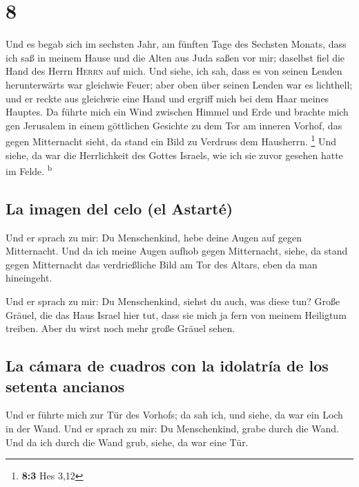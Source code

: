 \hypertarget{section-7}{%
\section{8}\label{section-7}}

 Und es begab sich im sechsten Jahr, am fünften Tage des
Sechsten Monats, dass ich saß in meinem Hause und die Alten aus Juda
saßen vor mir; daselbst fiel die Hand des Herrn \textsc{Herrn} auf mich.
 Und siehe, ich sah, dass es von seinen Lenden
herunterwärts war gleichwie Feuer; aber oben über seinen Lenden war es
lichthell;  und er reckte aus gleichwie eine Hand und
ergriff mich bei dem Haar meines Hauptes. Da führte mich ein Wind
zwischen Himmel und Erde und brachte mich gen Jerusalem in einem
göttlichen Gesichte zu dem Tor am inneren Vorhof, das gegen Mitternacht
sieht, da stand ein Bild zu Verdruss dem Hausherrn. \footnote{\textbf{8:3}
  Hes 3,12}  Und siehe, da war die Herrlichkeit des Gottes
Israels, wie ich sie zuvor gesehen hatte im Felde. \textsuperscript{b}

\hypertarget{la-imagen-del-celo-el-astartuxe9}{%
\subsection{La imagen del celo (el
Astarté)}\label{la-imagen-del-celo-el-astartuxe9}}

 Und er sprach zu mir: Du Menschenkind, hebe deine Augen
auf gegen Mitternacht. Und da ich meine Augen aufhob gegen Mitternacht,
siehe, da stand gegen Mitternacht das verdrießliche Bild am Tor des
Altars, eben da man hineingeht.

 Und er sprach zu mir: Du Menschenkind, siehst du auch,
was diese tun? Große Gräuel, die das Haus Israel hier tut, dass sie mich
ja fern von meinem Heiligtum treiben. Aber du wirst noch mehr große
Gräuel sehen.

\hypertarget{la-cuxe1mara-de-cuadros-con-la-idolatruxeda-de-los-setenta-ancianos}{%
\subsection{La cámara de cuadros con la idolatría de los setenta
ancianos}\label{la-cuxe1mara-de-cuadros-con-la-idolatruxeda-de-los-setenta-ancianos}}

 Und er führte mich zur Tür des Vorhofs; da sah ich, und
siehe, da war ein Loch in der Wand.  Und er sprach zu mir:
Du Menschenkind, grabe durch die Wand. Und da ich durch die Wand grub,
siehe, da war eine Tür.

